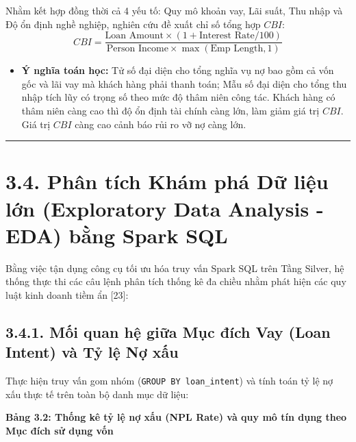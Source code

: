 \documentclass[
  13pt,
  a4paper,
]{report}
\providecommand{\tightlist}{%
  \setlength{\itemsep}{0pt}\setlength{\parskip}{0pt}}
\begin{document}
Nhằm kết hợp đồng thời cả 4 yếu tố: Quy mô khoản vay, Lãi suất, Thu nhập
và Độ ổn định nghề nghiệp, nghiên cứu đề xuất chỉ số tổng hợp \(CBI\):
\[CBI = \frac{\text{Loan Amount} \times (1 + \text{Interest Rate} / 100)}{\text{Person Income} \times \max(\text{Emp Length}, 1)}\]

\begin{itemize}
\tightlist
\item
  \textbf{Ý nghĩa toán học:} Tử số đại diện cho tổng nghĩa vụ nợ bao gồm
  cả vốn gốc và lãi vay mà khách hàng phải thanh toán; Mẫu số đại diện
  cho tổng thu nhập tích lũy có trọng số theo mức độ thâm niên công tác.
  Khách hàng có thâm niên càng cao thì độ ổn định tài chính càng lớn,
  làm giảm giá trị \(CBI\). Giá trị \(CBI\) càng cao cảnh báo rủi ro vỡ
  nợ càng lớn.
\end{itemize}

\begin{center}\rule{0.5\linewidth}{0.5pt}\end{center}

\section{3.4. Phân tích Khám phá Dữ liệu lớn (Exploratory Data Analysis
- EDA) bằng Spark
SQL}\label{phuxe2n-tuxedch-khuxe1m-phuxe1-dux1eef-liux1ec7u-lux1edbn-exploratory-data-analysis---eda-bux1eb1ng-spark-sql}

Bằng việc tận dụng công cụ tối ưu hóa truy vấn Spark SQL trên Tầng
Silver, hệ thống thực thi các câu lệnh phân tích thống kê đa chiều nhằm
phát hiện các quy luật kinh doanh tiềm ẩn {[}23{]}:

\subsection{3.4.1. Mối quan hệ giữa Mục đích Vay (Loan Intent) và Tỷ lệ
Nợ
xấu}\label{mux1ed1i-quan-hux1ec7-giux1eefa-mux1ee5c-ux111uxedch-vay-loan-intent-vuxe0-tux1ef7-lux1ec7-nux1ee3-xux1ea5u}

Thực hiện truy vấn gom nhóm (\texttt{GROUP\ BY\ loan\_intent}) và tính
toán tỷ lệ nợ xấu thực tế trên toàn bộ danh mục dữ liệu:

\textbf{Bảng 3.2: Thống kê tỷ lệ nợ xấu (NPL Rate) và quy mô tín dụng
theo Mục đích sử dụng vốn}
\end{document}

